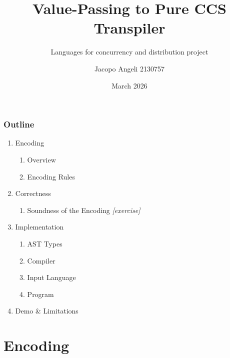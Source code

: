 \documentclass[t]{beamer}
\title{Value-Passing to Pure CCS Transpiler}
\subtitle{Languages for concurrency and distribution project}
\author{Jacopo Angeli  2130757}
\institute[UniPd]{Università degli studi di Padova}
\date{March 2026}
\begin{document}
\begin{frame}
\titlepage
\end{frame}

\begin{frame}[c]
  \frametitle{Outline}
  \begin{enumerate}
    \item Encoding
    \begin{enumerate}
      \item Overview
      \item Encoding Rules
    \end{enumerate}
    \item Correctness
    \begin{enumerate}
      \item Soundness of the Encoding \quad \textit{[exercise]}
    \end{enumerate}
    \item Implementation
    \begin{enumerate}
      \item AST Types
      \item Compiler
      \item Input Language
      \item Program
    \end{enumerate}
    \item Demo \& Limitations
  \end{enumerate}
\end{frame}

\section{Encoding}
\end{document}
